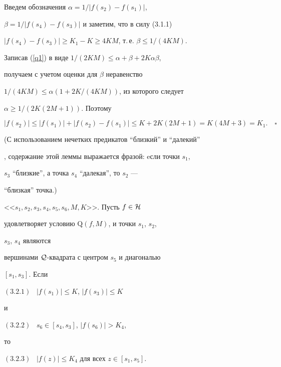 Введем обозначения $\alpha = 1/|f(s_2) - f(s_1)|$, 


$\beta = 1/|f(s_4) - f(s_3)|$ и заметим, что в силу (3.1.1) 


$|f(s_4) - f(s_3)|\geq K_1 - K \geq 4KM$, т.\,е. $\beta \leq 1/(4KM)$. 


Записав (\ref{q1}) в виде $1/(2KM) \leq \alpha + \beta + 2K\alpha \beta$, 


получаем с учетом оценки для $\beta$ неравенство 


$1/(4KM) \leq \alpha(1+ 2K/(4KM))$, из которого следует


$\alpha \geq 1/(2K(2M+1))$. Поэтому


$$


|f(s_2)| \leq 


|f(s_1)|+|f(s_2) - f(s_1)| \leq K+2K(2M+1) = K(4M+3)=K_1.\quad\square


$$ 





(С использованием нечетких предикатов ``близкий'' и ``далекий''


\cite{Ja}, содержание этой леммы выражается фразой: eсли точки $s_1$, 


$s_3$ ``близкие'', а точка $s_4$ ``далекая'', то $s_2$ ---


``близкая'' точка.) 





\begin{lems}


<<$s_1, s_2, s_3, s_4, s_5, s_6, M, K $>>. Пусть $f\in {\cal H}$ 


удовлетворяет условию $\mathrm Q(f,M)$, и точки $s_1$, $s_2$,


$s_3$, $s_4$ являются 


вершинами ${\cal Q}$-квадрата с центром $s_5$ и диагональю 


$[s_1, s_3]$. Если





$(3.2.1)$ \ $|f(s_1)|\leq K$, $|f(s_3)| \leq K$





\noindent{}и





$(3.2.2)$ \ $s_6 \in [s_4, s_3]$, $|f(s_6)| > K_4 $,





\noindent{}то





$(3.2.3)$ \ $|f(z)| \leq K_4$ для всех $z\in [s_1, s_5]$.


\end{lems}





